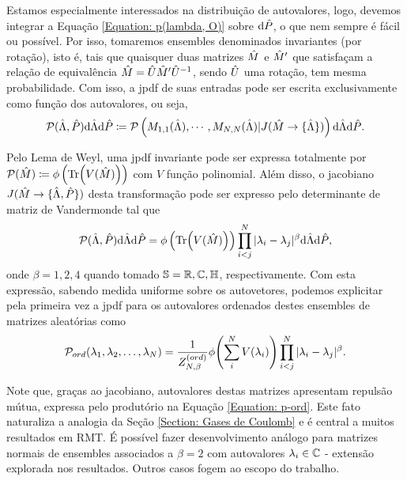 Estamos especialmente interessados na distribuição de autovalores, logo, devemos integrar a Equação \eqref{Equation: p(lambda, O)} sobre $\dd \hat P$, o que nem sempre é fácil ou possível. Por isso, tomaremos ensembles denominados invariantes (por rotação), isto é, tais que quaisquer duas matrizes $\hat M$ e $\hat M'$ que satisfaçam a relação de equivalência $\hat M = \hat U \hat M' \hat U^{-1}$, sendo $\hat U$ uma rotação, tem mesma probabilidade. Com isso, a jpdf de suas entradas pode ser escrita exclusivamente como função dos autovalores, ou seja, $$\mathcal{P}(\hat\Lambda, \hat P) \dd \hat\Lambda \dd \hat P \coloneqq \mathcal{P} \left( M_{1,1}( \hat\Lambda), \cdots, M_{N,N}(\hat\Lambda) | J(\hat M \rightarrow \{\hat\Lambda\} ) \right) \dd \hat\Lambda \dd \hat P.$$

Pelo Lema de Weyl, uma jpdf invariante pode ser expressa totalmente por $\mathcal{P}(\hat M) \coloneqq \phi \left(\Tr(V(\hat M)) \right)$ com $V$ função polinomial. Além disso, o jacobiano $J(\hat M \rightarrow \{\hat\Lambda, \hat P\} )$ desta transformação pode ser expresso pelo determinante de matriz de Vandermonde tal que $$\mathcal{P}(\hat\Lambda, \hat P) \dd \hat\Lambda \dd \hat P = \phi \left(\Tr(V(\hat M)) \right) \prod_{i<j}^{N} |\lambda_i - \lambda_j|^{\beta} \dd \hat\Lambda \dd \hat P,$$ onde $\beta = 1,2,4$ quando tomado $\mathbb{S} = \mathbb{R}, \mathbb{C}, \mathbb{H}$, respectivamente. Com esta expressão, sabendo medida uniforme sobre os autovetores, podemos explicitar pela primeira vez a jpdf para os autovalores ordenados destes ensembles de matrizes aleatórias como 
\begin{equation}
	\mathcal{P}_{ord}(\lambda_1, \lambda_2, \dots, \lambda_N) = \frac{1}{Z_{N, \beta}^{(ord)}} \phi{\left( \sum_i^N V(\lambda_i) \right)} \prod_{i < j}^{N} |\lambda_i - \lambda_j|^{\beta}.
	\label{Equation: p-ord}
\end{equation}

Note que, graças ao jacobiano, autovalores destas matrizes apresentam repulsão mútua, expressa pelo produtório na Equação \eqref{Equation: p-ord}. Este fato naturaliza a analogia da Seção \ref{Section: Gases de Coulomb} e é central a muitos resultados em RMT. É possível fazer desenvolvimento análogo para matrizes normais de ensembles associados a $\beta = 2$ com autovalores $\lambda_i \in \mathbb{C}$ - extensão explorada nos resultados. Outros casos fogem ao escopo do trabalho.

